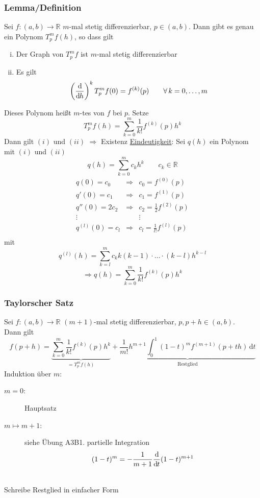 \subsubsection{Lemma/Definition} %
\label{ssub:lemma_definition}
Sei $f:(a,b) \to \mathbb{R}$ $m$-mal stetig differenzierbar, $p \in (a,b)$. Dann gibt es genau ein Polynom $T_p^mf(h)$, so dass gilt
\begin{enumerate}[(i)]
	\item Der Graph von $T^m_pf$ ist $m$-mal stetig differenzierbar
	\item Es gilt
	\[
		\left( \frac{\mathrm{d}\mkern-1.0mu }{\mathrm{d}\mkern-1.0mu h}  \right)^k T_p^mf(0)= f^{(k)}(p) \qquad \forall\, k=0,\dots,m
	\]
\end{enumerate}
Dieses Polynom heißt $m$-tes  von $f$ bei $p$.
 Setze
\[
	T_p^mf(h)=\sum_{k=0}^{m}\frac{1}{k!}f^{(k)}(p)h^k
\]
Dann gilt $(i)$ und $(ii)$ $\Rightarrow$ Existenz
\underline{Eindeutigkeit}: Sei $q(h)$ ein Polynom mit $(i)$ und $(ii)$
\[
	q(h)= \sum_{k=0}^{m}c_kh^k \qquad c_k \in \mathbb{R}
\]
\[
	\begin{array}{ccc}
	q(0)=c_0 & \Rightarrow & c_0=f^{(0)}(p) \\
	q'(0)=c_1 & \Rightarrow & c_1=f^{(1)}(p) \\
	q''(0)=2c_2 & \Rightarrow & c_2=\frac{1}{2}f^{(2)}(p) \\
	\vdots & & \vdots \\
	q^{(l)}(0)=c_l & \Rightarrow & c_l=\frac{1}{l!}f^{(l)}(p) \\
	\end{array}
\] 
mit
\[
	q^(l)(h)= \sum_{k=l}^{m}c_kk(k-1) \cdot \dots \cdot (k-l)h^{k-l}
\]
\[
	\Rightarrow q(h)=\sum_{k=0}^{m}\frac{1}{k!}f^{(k)}(p)h^k
\] \bewende
\subsubsection{Taylorscher Satz} %
\label{taylor}
Sei $f:(a,b) \to \mathbb{R}$ $(m+1)$-mal stetig differenzierbar, $p,p+h \in (a,b)$. \\
Dann gilt
\[
	f(p+h)= \underset{= T^m_pf(h)}{\underbrace{\sum_{k=0}^{m}\frac{1}{k!}f^{(k)}(p)h^k}} 
	+ \underset{\text{Restglied}}{\underbrace{\frac{1}{m!}h^{m+1}\int_{0}^{1}(1-t)^mf^{(m+1)}(p+th) \,\mathrm{d}t}}
\]
 Induktion über $m$:
\begin{description}
	\item[$m=0$:] Hauptsatz
	\item[$m \mapsto m+1$:] siehe Übung A3B1. partielle Integration
	\[
	 (1-t)^m= - \frac{1}{m+1}\frac{\mathrm{d}\mkern-1.0mu }{\mathrm{d}\mkern-1.0mu t} (1-t)^{m+1}
	\] 
\end{description}\bewende \\
Schreibe Restglied in einfacher Form
